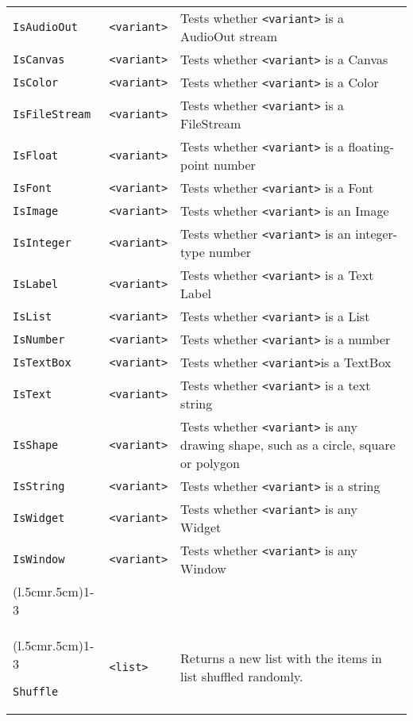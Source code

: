 \begin{longtable}{p{3cm}p{3cm}p{6cm}}
\verb+IsAudioOut+ & \verb+<variant>+ & Tests whether \verb+<variant>+ is a AudioOut stream\\ 
\verb+IsCanvas+ & \verb+<variant>+ & Tests whether \verb+<variant>+ is a Canvas\\ 
\verb+IsColor+ & \verb+<variant>+ & Tests whether \verb+<variant>+ is a Color\\ 
\verb+IsFileStream+ & \verb+<variant>+ & Tests whether \verb+<variant>+ is a FileStream\\ 
\verb+IsFloat+ & \verb+<variant>+ & Tests whether \verb+<variant>+ is a floating-point number\\ 
\verb+IsFont+ & \verb+<variant>+ & Tests whether \verb+<variant>+ is a Font\\ 
\verb+IsImage+ & \verb+<variant>+ & Tests whether \verb+<variant>+ is an Image\\ 
\verb+IsInteger+ & \verb+<variant>+ & Tests whether \verb+<variant>+ is an integer-type number\\ 
\verb+IsLabel+ & \verb+<variant>+ & Tests whether \verb+<variant>+ is a Text Label\\ 
\verb+IsList+ & \verb+<variant>+ & Tests whether \verb+<variant>+ is a List\\ 
\verb+IsNumber+ & \verb+<variant>+ & Tests whether \verb+<variant>+ is a number \\ 
\verb+IsTextBox+ & \verb+<variant>+ & Tests whether \verb+<variant>+is a TextBox\\ 
\verb+IsText+ & \verb+<variant>+ & Tests whether \verb+<variant>+ is a text string\\ 
\verb+IsShape+ & \verb+<variant>+ & Tests whether \verb+<variant>+ is any drawing shape, such as a circle, square or polygon\\ 
\verb+IsString+ & \verb+<variant>+ & Tests whether \verb+<variant>+ is a string\\ 
\verb+IsWidget+ & \verb+<variant>+ & Tests whether \verb+<variant>+ is any Widget\\ 
\verb+IsWindow+ & \verb+<variant>+ & Tests whether \verb+<variant>+ is any Window\\ 


\addlinespace[0.2cm] 

\cmidrule(l{.5cm}r{.5cm}){1-3} 
\multicolumn{3}{c}{\textbf{List Manipulation Functions}}\\ 
\cmidrule(l{.5cm}r{.5cm}){1-3} 

\verb+Shuffle+ & \verb+<list>+ & Returns a new list with the items in list shuffled randomly. \\ 


\end{longtable}
